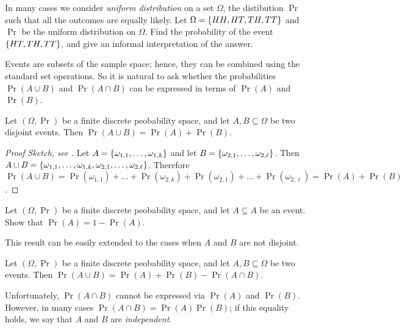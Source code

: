 \begin{exercise}
  In many cases we consider \emph{uniform distribution} on a set $\Omega$, the
  distibution $\Pr$ such that all the outcomes are equally likely.
  Let $\Omega = \set{HH, HT, TH, TT}$ and $\Pr$ be the uniform distribution on
  $\Omega$. Find the probability of the event $\set{HT, TH, TT}$, and give an
  informal interpretation of the answer.
\end{exercise}

Events are subsets of the sample space; hence, they can be combined using the
standard set operations. So it is natural to ask whether the probabilities
$\Pr(A \cup B)$ and $\Pr(A \cap B)$ can be expressed in terms of $\Pr(A)$ and
$\Pr(B)$.

\begin{theorem}
  Let $(\Omega, \Pr)$ be a finite discrete peobability space, and let $A, B
  \subseteq \Omega$ be two disjoint events. Then 
  $\Pr(A \cup B) = \Pr(A) + \Pr(B)$.
\end{theorem}
\begin{proof}[Proof Sketch, see ]
  Let $A = \set{\omega_{1, 1}, \dots, \omega_{1, k}}$ and 
  let $B = \set{\omega_{2, 1}, \dots, \omega_{2, \ell}}$. 
  Then $A \cup B = \set{\omega_{1, 1}, \dots, \omega_{1, k}, 
    \omega_{2, 1}, \dots, \omega_{2, \ell}}$.
  Therefore $\Pr(A \cup B) = 
    \Pr(\omega_{1, 1}) + \dots + \Pr(\omega_{2, k}) +
    \Pr(\omega_{2, 1}) + \dots + \Pr(\omega_{2, \ell}) = \Pr(A) + \Pr(B)$.
\end{proof}

\begin{exercise}
  Let $(\Omega, \Pr)$ be a finite discrete peobability space, and let $A
  \subseteq A$ be an event. Show that $\Pr(A) = 1 - \Pr(A)$.
\end{exercise}

This result can be easily extended to the cases when $A$ and $B$ are not
disjoint.
\begin{corollary}
\label{corollary:inclusion-exclustion-probability}
  Let $(\Omega, \Pr)$ be a finite discrete peobability space, and let $A, B
  \subseteq \Omega$ be two events. Then 
  $\Pr(A \cup B) = \Pr(A) + \Pr(B) - \Pr(A \cap B)$.
\end{corollary}

Unfortunately, $\Pr(A \cap B)$ cannot be expressed via $\Pr(A)$ and $\Pr(B)$.
However, in many cases $\Pr(A \cap B) = \Pr(A) \Pr(B)$; if this equality holds,
we say that $A$ and $B$ are \emph{independent}.

